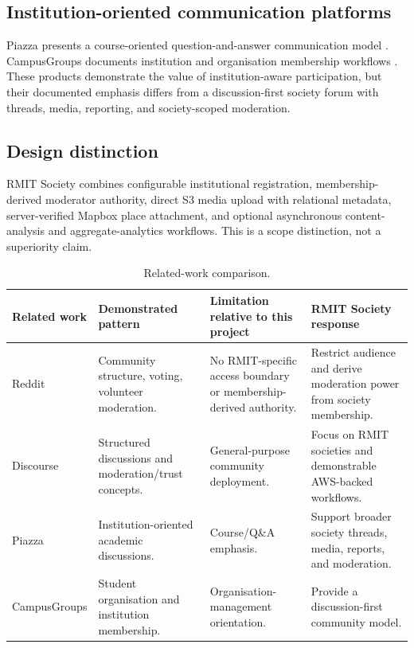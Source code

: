 \documentclass[11pt,a4paper]{article}
\begin{document}
\subsection{Institution-oriented communication platforms}
Piazza presents a course-oriented question-and-answer communication model \cite{piazza}. CampusGroups documents institution and organisation membership workflows \cite{campusgroups}. These products demonstrate the value of institution-aware participation, but their documented emphasis differs from a discussion-first society forum with threads, media, reporting, and society-scoped moderation.

\subsection{Design distinction}
RMIT Society combines configurable institutional registration, membership-derived moderator authority, direct S3 media upload with relational metadata, server-verified Mapbox place attachment, and optional asynchronous content-analysis and aggregate-analytics workflows. This is a scope distinction, not a superiority claim.

\begin{table}[h]\centering\small
\caption{Related-work comparison.}\label{tab:related-work}
\begin{tabularx}{\textwidth}{@{}p{24mm}Y Y Y@{}}
\toprule \textbf{Related work} & \textbf{Demonstrated pattern} & \textbf{Limitation relative to this project} & \textbf{RMIT Society response}\\ \midrule
Reddit & Community structure, voting, volunteer moderation. & No RMIT-specific access boundary or membership-derived authority. & Restrict audience and derive moderation power from society membership.\\
Discourse & Structured discussions and moderation/trust concepts. & General-purpose community deployment. & Focus on RMIT societies and demonstrable AWS-backed workflows.\\
Piazza & Institution-oriented academic discussions. & Course/Q\&A emphasis. & Support broader society threads, media, reports, and moderation.\\
CampusGroups & Student organisation and institution membership. & Organisation-management orientation. & Provide a discussion-first community model.\\
\bottomrule
\end{tabularx}
\end{table}
\end{document}
